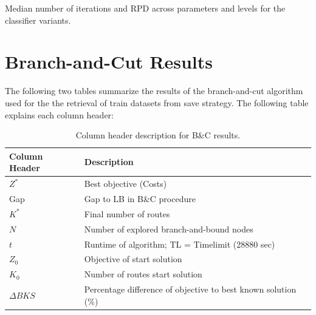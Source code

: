 \begin{table}[!ht]
	\caption{Median number of iterations and RPD across parameters and levels for the classifier variants.}
	\label{tab:numerical_results_paramStudy_classifiers}
\end{table}


\clearpage
\section{Branch-and-Cut Results}

The following two tables summarize the results of the branch-and-cut algorithm used for the the retrieval of train datasets
from save strategy. The following table explains each column header:

\begin{table}[ht]
	\centering
	\small
	\begin{tabular}{C{0.2\textwidth}C{0.74\textwidth}}
		\toprule
		Column Header & Description                                                    \\
		\midrule
		$Z^*$         & Best objective (Costs)                                         \\
		Gap           & Gap to \gls{LB} in B\&C procedure                              \\
		$K^*$         & Final number of routes                                         \\
		$N$           & Number of explored branch-and-bound nodes                      \\
		$t$           & Runtime of algorithm; TL = Timelimit (28880 sec)               \\
		$Z_0$         & Objective of start solution                                    \\
		$K_0$         & Number of routes start solution                                \\
		$\Delta BKS$  & Percentage difference of objective to best known solution (\%) \\
		\bottomrule
	\end{tabular}
	\caption{Column header description for B\&C results.}
	\label{tab:column_header_description_bc}
\end{table}



